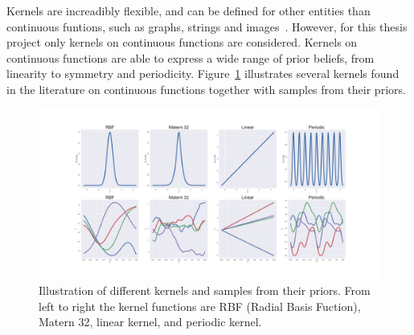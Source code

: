 Kernels are increadibly flexible, and can be defined for other entities than continuous
funtions, such as graphs, strings and
images~\cite{duvenaud2013structure}. However, for this thesis project
only kernels on continuous functions are considered. Kernels on
continuous functions are able to express a wide range of prior beliefs, from linearity to symmetry and
periodicity. Figure~\ref{fig:kernel-priors} illustrates several kernels
found in the literature on continuous functions together with samples from their priors.
\begin{figure}
  \centering
  \includegraphics[width=\textwidth]{figures/kernel-priors-vert}
  \caption{Illustration of different kernels and samples from their
    priors. From left to right the kernel functions are RBF (Radial
    Basis Fuction), Matern 32, linear kernel, and periodic kernel.}\label{fig:kernel-priors}
\end{figure}

